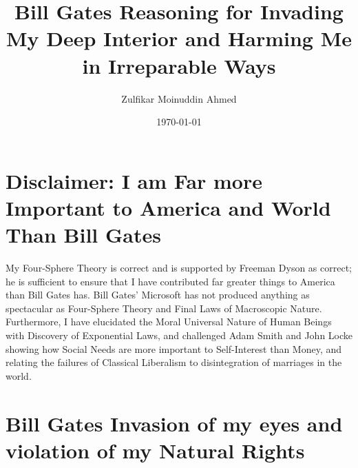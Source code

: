 \documentclass{amsart}
\title{Bill Gates Reasoning for Invading My Deep Interior and Harming Me in Irreparable Ways}
\author{Zulfikar Moinuddin Ahmed}
\date{\today}
\begin{document}
\maketitle

\section{Disclaimer: I am Far more Important to America and World Than Bill Gates}

My Four-Sphere Theory is correct and is supported by Freeman Dyson as correct; he is sufficient to ensure that I have contributed far greater things to America than Bill Gates has.  Bill Gates' Microsoft has not produced anything as spectacular as Four-Sphere Theory and Final Laws of Macroscopic Nature. Furthermore, I have elucidated the Moral Universal Nature of Human Beings with Discovery of Exponential Laws, and challenged Adam Smith and John Locke showing how Social Needs are more important to Self-Interest than Money, and relating the failures of Classical Liberalism to disintegration of marriages in the world.

\section{Bill Gates Invasion of my eyes and violation of my Natural Rights}
\end{document}
